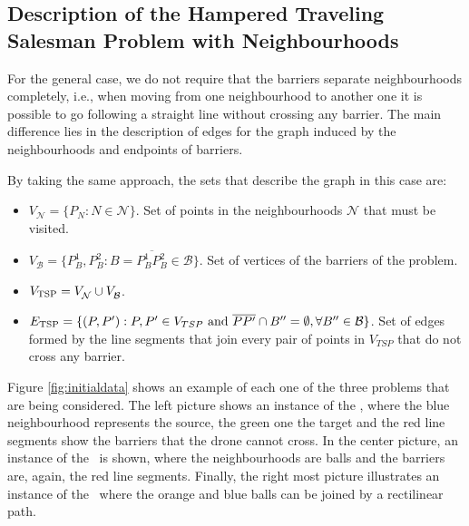 \documentclass[a4paper,  review, authoryear, 1p.]{elsarticle}
\newcommand{\SPPN}{{\sf{H-SPPN}\xspace }}
\newcommand{\TSPHN}{{\sf{H-TSPHN}\xspace }}
\newcommand{\TSPN}{{\sf{H-TSPN}\xspace }}
\newcommand{\B}{{\mathcal B}}
\newcommand{\VB}{{V^{}_{\mathcal B}}}
\newcommand{\VN}{{V^{}_{\mathcal N}}}
\newcommand{\CV}[1]{{\color{red}#1}}
\begin{document}
		
		\CV{
		\subsection{Description of the Hampered Traveling Salesman Problem with Neighbourhoods}
		For the general case, we do not require that the barriers separate neighbourhoods completely, i.e., when moving from one neighbourhood to another one it is possible to go following a straight line without crossing any barrier. The main difference lies in the description of edges for the graph induced by the neighbourhoods and endpoints of barriers.}

		By taking the same approach, the sets that describe the graph in this case are:
		
		\begin{itemize}
			\item $\VN=\{P_N:N\in\mathcal N\}$. Set of points in the neighbourhoods $\mathcal N$ that must be visited.
			\item $\VB=\{P^1_B, P^2_B:B=\overline{P^1_B P^2_B}\in \mathcal B\}$. Set of vertices of the barriers of the problem.
			\item $V_{\rm TSP} = \VN \cup \VB$.
			\item $E_{\rm TSP}=\{(P, P'):P, P' \in V_{TSP} \text{ and } \overline{PP'}\cap B''=\emptyset,\forall B''\in\B\}$. Set of edges formed by the line segments that join every pair of points in $V_{TSP}$ that do not cross any barrier.
		\end{itemize} 
		
		Figure \ref{fig:initialdata} shows an example of each one of the three problems that are being considered. The left picture shows an instance of the \SPPN, where the blue neighbourhood represents the source, the green one the target and the red line segments show the barriers that the drone cannot cross. In the center picture, an instance of the \TSPHN \  is shown, where the neighbourhoods are balls and the barriers are, again, the red line segments. Finally, the right most picture illustrates an instance of the \TSPN \ where the orange and blue balls can be joined by a rectilinear path.
		
		
		
\end{document}
